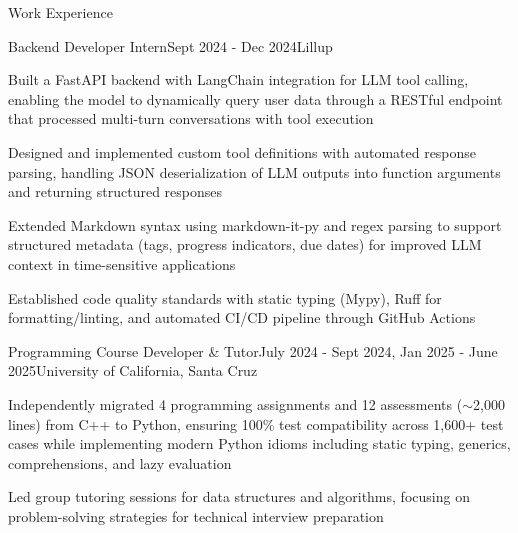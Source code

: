 \documentclass{resume}
\begin{document}
\begin{rSection}{Work Experience}

  \begin{rSubsection}{Backend Developer Intern}{Sept 2024 - Dec 2024}{Lillup}{}
  \item{} Built a FastAPI backend with LangChain integration for LLM
    tool calling, enabling the model to dynamically query user data
    through a RESTful endpoint that processed multi-turn
    conversations with tool execution
  \item{} Designed and implemented custom tool definitions with
    automated response parsing, handling JSON deserialization of LLM
    outputs into function arguments and returning structured responses
  \item{} Extended Markdown syntax using markdown-it-py and regex parsing
    to support structured metadata (tags, progress indicators, due
    dates) for improved LLM context in time-sensitive applications
  \item{} Established code quality standards with static typing (Mypy),
    Ruff for formatting/linting, and automated CI/CD pipeline through
    GitHub Actions
  \end{rSubsection}

  \begin{rSubsection}{Programming Course Developer \& Tutor}{July 2024
    - Sept 2024, Jan 2025 - June 2025}{University of California, Santa Cruz}{}
  \item{} Independently migrated 4 programming assignments and 12
    assessments ($\sim$2,000 lines) from C++ to Python,
    ensuring 100\%
    test compatibility across 1,600+ test cases while implementing
    modern Python idioms including static typing, generics,
    comprehensions, and lazy evaluation
  \item{} Led group tutoring sessions for data structures and
    algorithms, focusing on problem-solving strategies for technical
    interview preparation
  \end{rSubsection}

\end{rSection}
\end{document}
